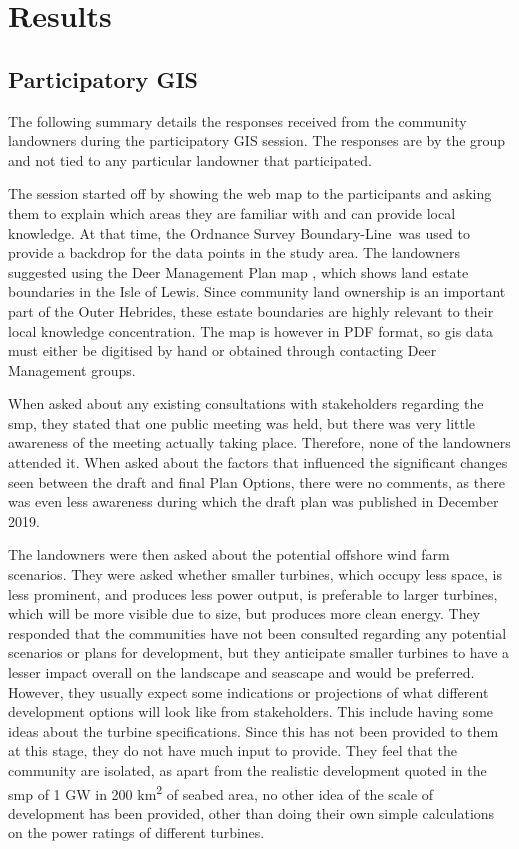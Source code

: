 \chapter{Results}

\section{Participatory GIS}

The following summary details the responses received from the community
landowners during the participatory GIS session. The responses are by the group
and not tied to any particular landowner that participated.

The session started off by showing the web map to the participants and asking
them to explain which areas they are familiar with and can provide local
knowledge. At that time, the Ordnance Survey Boundary-Line\texttrademark\ was
used to provide a backdrop for the data points in the study area. The
landowners suggested using the Deer Management Plan map \autocite{dmg-map},
which shows land estate boundaries in the Isle of Lewis. Since community land
ownership is an important part of the Outer Hebrides, these estate boundaries
are highly relevant to their local knowledge concentration. The map is however
in PDF format, so \gls{gis} data must either be digitised by hand or obtained
through contacting Deer Management groups.

When asked about any existing consultations with stakeholders regarding the
\gls{smp}, they stated that one public meeting was held, but there was very
little awareness of the meeting actually taking place. Therefore, none of the
landowners attended it. When asked about the factors that influenced the
significant changes seen between the draft and final Plan Options, there were
no comments, as there was even less awareness during which the draft plan was
published in December 2019.

The landowners were then asked about the potential offshore wind farm
scenarios. They were asked whether smaller turbines, which occupy less space,
is less prominent, and produces less power output, is preferable to larger
turbines, which will be more visible due to size, but produces more clean
energy. They responded that the communities have not been consulted regarding
any potential scenarios or plans for development, but they anticipate smaller
turbines to have a lesser impact overall on the landscape and seascape and
would be preferred. However, they usually expect some indications or
projections of what different development options will look like from
stakeholders. This include having some ideas about the turbine specifications.
Since this has not been provided to them at this stage, they do not have much
input to provide. They feel that the community are isolated, as apart from the
realistic development quoted in the \gls{smp} of 1 GW in 200
km\textsuperscript{2} of seabed area, no other idea of the scale of development
has been provided, other than doing their own simple calculations on the power
ratings of different turbines.


